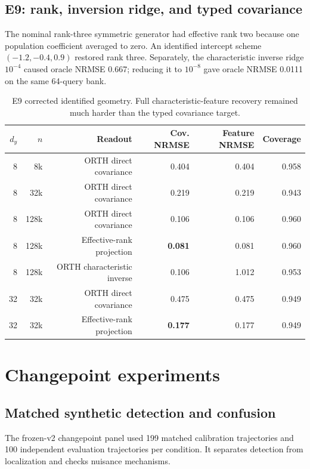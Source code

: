 \documentclass[10pt]{article}
\newcommand{\best}[1]{\ifmmode\boldsymbol{#1}\else\textbf{#1}\fi}
\begin{document}
\subsection{E9: rank, inversion ridge, and typed covariance}

The nominal rank-three symmetric generator had effective rank two because one population coefficient averaged to zero. An identified intercept scheme $(-1.2,-0.4,0.9)$ restored rank three. Separately, the characteristic inverse ridge $10^{-4}$ caused oracle NRMSE 0.667; reducing it to $10^{-8}$ gave oracle NRMSE 0.0111 on the same 64-query bank.

\begin{table}[H]
\centering\small
\begin{tabular}{rrrrrr}
\toprule
$d_y$ & $n$ & Readout & Cov. NRMSE & Feature NRMSE & Coverage \\
\midrule
8 & 8k & ORTH direct covariance & 0.404 & 0.404 & 0.958 \\
8 & 32k & ORTH direct covariance & 0.219 & 0.219 & 0.943 \\
8 & 128k & ORTH direct covariance & 0.106 & 0.106 & 0.960 \\
8 & 128k & Effective-rank projection & \best{0.081} & 0.081 & 0.960 \\
8 & 128k & ORTH characteristic inverse & 0.106 & 1.012 & 0.953 \\
32 & 32k & ORTH direct covariance & 0.475 & 0.475 & 0.949 \\
32 & 32k & Effective-rank projection & \best{0.177} & 0.177 & 0.949 \\
\bottomrule
\end{tabular}
\caption{E9 corrected identified geometry. Full characteristic-feature recovery remained much harder than the typed covariance target.}
\end{table}

\section{Changepoint experiments}

\subsection{Matched synthetic detection and confusion}

The frozen-v2 changepoint panel used 199 matched calibration trajectories and 100 independent evaluation trajectories per condition. It separates detection from localization and checks nuisance mechanisms.
\end{document}
